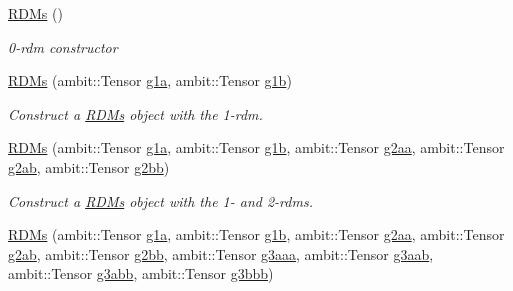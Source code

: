 \begin{DoxyCompactItemize}
\item 
\mbox{\hyperlink{classforte_1_1_r_d_ms_a66632414857a05a11ee59057112d7886}{R\+D\+Ms}} ()
\begin{DoxyCompactList}\small\item\em 0-\/rdm constructor \end{DoxyCompactList}\item 
\mbox{\hyperlink{classforte_1_1_r_d_ms_ae7fd52d5cd4057aa5f3a62d66e508d72}{R\+D\+Ms}} (ambit\+::\+Tensor \mbox{\hyperlink{classforte_1_1_r_d_ms_ace67ab047686bffaf52839a191068d07}{g1a}}, ambit\+::\+Tensor \mbox{\hyperlink{classforte_1_1_r_d_ms_aa71a38929b7b94762d51afd5fd796fa9}{g1b}})
\begin{DoxyCompactList}\small\item\em Construct a \mbox{\hyperlink{classforte_1_1_r_d_ms}{R\+D\+Ms}} object with the 1-\/rdm. \end{DoxyCompactList}\item 
\mbox{\hyperlink{classforte_1_1_r_d_ms_a0b94a7646ff854c5a6dac171ea7ec3f0}{R\+D\+Ms}} (ambit\+::\+Tensor \mbox{\hyperlink{classforte_1_1_r_d_ms_ace67ab047686bffaf52839a191068d07}{g1a}}, ambit\+::\+Tensor \mbox{\hyperlink{classforte_1_1_r_d_ms_aa71a38929b7b94762d51afd5fd796fa9}{g1b}}, ambit\+::\+Tensor \mbox{\hyperlink{classforte_1_1_r_d_ms_a632afec6c1bfe555e0df992d23b1ac6c}{g2aa}}, ambit\+::\+Tensor \mbox{\hyperlink{classforte_1_1_r_d_ms_a5c2574da5bf2aba775481f0c46fb4202}{g2ab}}, ambit\+::\+Tensor \mbox{\hyperlink{classforte_1_1_r_d_ms_a60b2559c5aeb5d447335ebcd2897d4ad}{g2bb}})
\begin{DoxyCompactList}\small\item\em Construct a \mbox{\hyperlink{classforte_1_1_r_d_ms}{R\+D\+Ms}} object with the 1-\/ and 2-\/rdms. \end{DoxyCompactList}\item 
\mbox{\hyperlink{classforte_1_1_r_d_ms_a1821993fd4f7662eeed418333791263e}{R\+D\+Ms}} (ambit\+::\+Tensor \mbox{\hyperlink{classforte_1_1_r_d_ms_ace67ab047686bffaf52839a191068d07}{g1a}}, ambit\+::\+Tensor \mbox{\hyperlink{classforte_1_1_r_d_ms_aa71a38929b7b94762d51afd5fd796fa9}{g1b}}, ambit\+::\+Tensor \mbox{\hyperlink{classforte_1_1_r_d_ms_a632afec6c1bfe555e0df992d23b1ac6c}{g2aa}}, ambit\+::\+Tensor \mbox{\hyperlink{classforte_1_1_r_d_ms_a5c2574da5bf2aba775481f0c46fb4202}{g2ab}}, ambit\+::\+Tensor \mbox{\hyperlink{classforte_1_1_r_d_ms_a60b2559c5aeb5d447335ebcd2897d4ad}{g2bb}}, ambit\+::\+Tensor \mbox{\hyperlink{classforte_1_1_r_d_ms_a7e97b6c90f40a9efe1adc58ca9cfb844}{g3aaa}}, ambit\+::\+Tensor \mbox{\hyperlink{classforte_1_1_r_d_ms_a968c6ae793d2cb19a69d5f6412032557}{g3aab}}, ambit\+::\+Tensor \mbox{\hyperlink{classforte_1_1_r_d_ms_a022f38931e0a3a359035e01c29e9e948}{g3abb}}, ambit\+::\+Tensor \mbox{\hyperlink{classforte_1_1_r_d_ms_ad38af9f4dfcf8694d56922ccaf422ade}{g3bbb}})

\end{DoxyCompactItemize}
